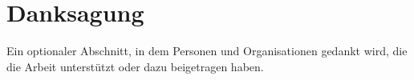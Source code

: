 \chapter*{Danksagung}
\label{acknowledgments}

Ein optionaler Abschnitt, in dem Personen und Organisationen gedankt wird, die die Arbeit unterstützt oder dazu beigetragen haben.
